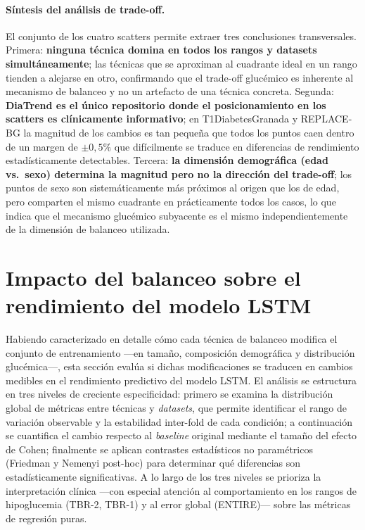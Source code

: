 \paragraph{Síntesis del análisis de trade-off.}
El conjunto de los cuatro scatters permite extraer tres conclusiones
transversales. Primera: \textbf{ninguna técnica domina en todos los rangos y
datasets simultáneamente}; las técnicas que se aproximan al cuadrante ideal
en un rango tienden a alejarse en otro, confirmando que el trade-off glucémico
es inherente al mecanismo de balanceo y no un artefacto de una técnica
concreta. Segunda: \textbf{DiaTrend es el único repositorio donde el
posicionamiento en los scatters es clínicamente informativo}; en T1DiabetesGranada
y REPLACE-BG la magnitud de los cambios es tan pequeña que todos los puntos
caen dentro de un margen de $\pm 0{,}5\%$ que difícilmente se traduce en
diferencias de rendimiento estadísticamente detectables. Tercera: \textbf{la
dimensión demográfica (edad vs.\ sexo) determina la magnitud pero no la
dirección del trade-off}; los puntos de sexo son sistemáticamente más próximos
al origen que los de edad, pero comparten el mismo cuadrante en prácticamente
todos los casos, lo que indica que el mecanismo glucémico subyacente es el
mismo independientemente de la dimensión de balanceo utilizada.


\section{Impacto del balanceo sobre el rendimiento del modelo LSTM}
\label{sec:analisis_mejora}

Habiendo caracterizado en detalle cómo cada técnica de balanceo modifica el
conjunto de entrenamiento ---en tamaño, composición demográfica y distribución
glucémica---, esta sección evalúa si dichas modificaciones se traducen en
cambios medibles en el rendimiento predictivo del modelo LSTM. El análisis
se estructura en tres niveles de creciente especificidad: primero se examina
la distribución global de métricas entre técnicas y \textit{datasets}, que
permite identificar el rango de variación observable y la estabilidad inter-fold
de cada condición; a continuación se cuantifica el cambio respecto al
\textit{baseline} original mediante el tamaño del efecto de Cohen; finalmente
se aplican contrastes estadísticos no paramétricos (Friedman y Nemenyi
post-hoc) para determinar qué diferencias son estadísticamente significativas.
A lo largo de los tres niveles se prioriza la interpretación clínica ---con
especial atención al comportamiento en los rangos de hipoglucemia (TBR-2,
TBR-1) y al error global (ENTIRE)--- sobre las métricas de regresión puras.


